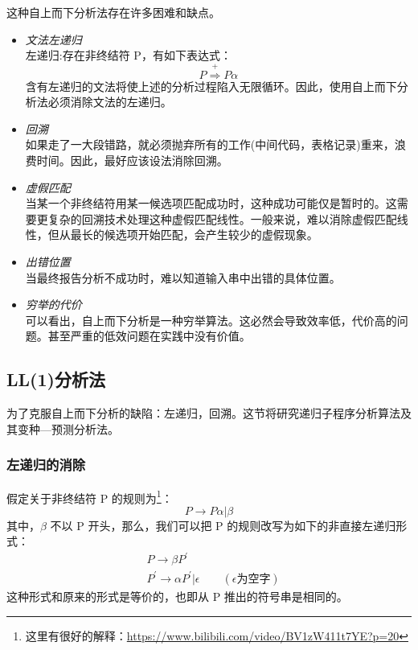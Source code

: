 这种自上而下分析法存在许多困难和缺点。
\begin{itemize}
    \item \textit{文法左递归} \\
          左递归:存在非终结符 P，有如下表达式：
          \[P \stackrel{+}{\Rightarrow} P \alpha \]
          含有左递归的文法将使上述的分析过程陷入无限循环。因此，使用自上而下分析法必须消除文法的左递归。
    \item \textit{回溯} \\
          如果走了一大段错路，就必须抛弃所有的工作(中间代码，表格记录)重来，浪费时间。因此，最好应该设法消除回溯。
    \item \textit{虚假匹配} \\
          当某一个非终结符用某一候选项匹配成功时，这种成功可能仅是暂时的。这需要更复杂的回溯技术处理这种虚假匹配线性。一般来说，难以消除虚假匹配线性，但从最长的候选项开始匹配，会产生较少的虚假现象。
    \item \textit{出错位置} \\
          当最终报告分析不成功时，难以知道输入串中出错的具体位置。
    \item \textit{穷举的代价} \\
          可以看出，自上而下分析是一种穷举算法。这必然会导致效率低，代价高的问题。甚至严重的低效问题在实践中没有价值。
\end{itemize}

\subsection{LL(1)分析法}

为了克服自上而下分析的缺陷：左递归，回溯。这节将研究递归子程序分析算法及其变种—预测分析法。

\subsubsection{左递归的消除}

假定关于非终结符 P 的规则为\footnote{这里有很好的解释：\url{https://www.bilibili.com/video/BV1zW411t7YE?p=20}}：
\[ P \rightarrow P\alpha|\beta \]
其中，$\beta$ 不以 P 开头，那么，我们可以把 P 的规则改写为如下的非直接左递归形式：
\begin{equation}
    \begin{aligned}
         & P \rightarrow \beta P^{'}                                                            \\
         & P^{'} \rightarrow \alpha P^{'} | \epsilon \qquad (\epsilon \text{为空字})  \nonumber
    \end{aligned}
\end{equation}
这种形式和原来的形式是等价的，也即从 P 推出的符号串是相同的。

